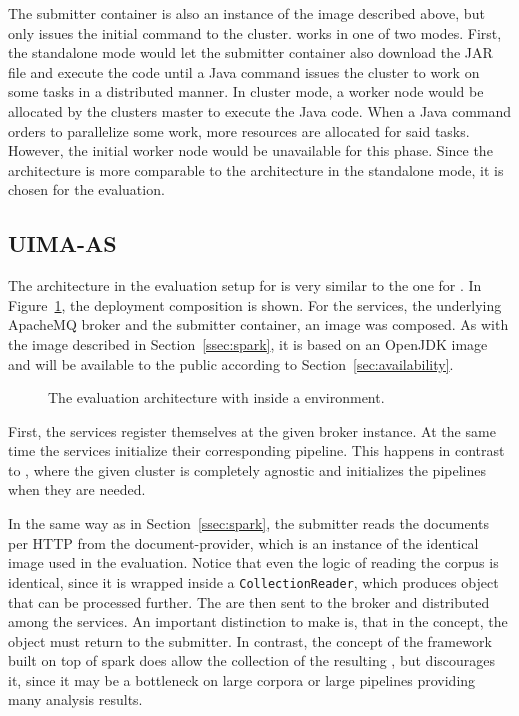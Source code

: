 The submitter container is also an instance of the \spark{} image described above, but only issues the initial command to the cluster. \spark{} works in one of two modes. First, the standalone mode would let the submitter container also download the JAR file and execute the code until a Java command issues the cluster to work on some tasks in a distributed manner. In cluster mode, a worker node would be allocated by the clusters master to execute the Java code. When a Java command orders \spark{} to parallelize some work, more resources are allocated for said tasks. However, the initial worker node would be unavailable for this phase. Since the architecture is more comparable to the \uimaas{} architecture in the standalone mode, it is chosen for the evaluation.
\subsection{UIMA-AS}
The \docker{} architecture in the evaluation setup for \uimaas{} is very similar to the one for \spark{}. In Figure~\ref{fig:arch-uimaas}, the deployment composition is shown. For the \uimaas{} services, the underlying ApacheMQ broker and the submitter container, an \uimaas{} \docker{} image was composed. As with the \spark{} image described in Section~\ref{ssec:spark}, it is based on an OpenJDK image and will be available to the public according to Section~\ref{sec:availability}.
\begin{figure}[htb]
	\centering
	
	\caption[The evaluation architecture with UIMA-AS inside a Docker environment.]{The evaluation architecture with \uimaas{} inside a \docker{} environment.}
	\label{fig:arch-uimaas}
\end{figure}
First, the \uimaas{} services register themselves at the given broker instance. At the same time the services initialize their corresponding pipeline. This happens in contrast to \spark{}, where the given cluster is completely \uima{} agnostic and initializes the pipelines when they are needed.

In the same way as in Section~\ref{ssec:spark}, the submitter reads the documents per HTTP from the document-provider, which is an instance of the identical image used in the \spark{} evaluation. Notice that even the logic of reading the corpus is identical, since it is wrapped inside a \lstinline|CollectionReader|, which produces \cas{} object that can be processed further. The \cas{} are then sent to the broker and distributed among the services. An important distinction to make is, that in the \uimaas{} concept, the \cas{} object must return to the submitter. In contrast, the concept of the framework built on top of spark does allow the collection of the resulting \cas{}, but discourages it, since it may be a bottleneck on large corpora or large pipelines providing many analysis results.

